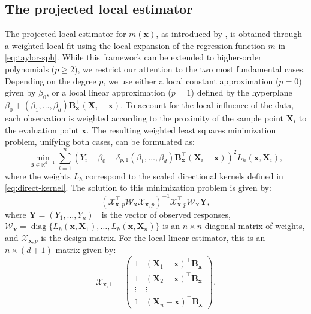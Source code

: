 \documentclass[12pt]{report} %
\newcommand{\bX}{\mathbf{X}}
\newcommand{\bx}{\mathbf{x}}
\newcommand{\bY}{\mathbf{Y}}
\newcommand{\bbe}{\boldsymbol{\beta}}
\newcommand{\bbX}{\boldsymbol{\mathcal{X}}}
\newcommand{\bbW}{\boldsymbol{\mathcal{W}}}
\newcommand{\bB}{\mathbf{B}}
\begin{document}
\subsection*{The projected local estimator}


The projected local estimator for $m(\bx)$, as introduced by \citet{Garcia-Portugues2014a}, is obtained through a weighted local fit using the local expansion of the regression function $m$ in \eqref{eq:taylor-sph}. While this framework can be extended to higher-order polynomials ($p \geq 2$), we restrict our attention to the two most fundamental cases. Depending on the degree $p$, we use either a local constant approximation ($p = 0$) given by $\beta_0$, or a local linear approximation ($p = 1$) defined by the hyperplane $\beta_0 + (\beta_1, \dots, \beta_d) \bB_{\bx}^\top (\bX_i - \bx)$. To account for the local influence of the data, each observation is weighted according to the proximity of the sample point $\bX_i$ to the evaluation point $\bx$. The resulting weighted least squares minimization problem, unifying both cases, can be formulated as:
\begin{equation}
\min_{\bbe \in \mathbb{R}^{d+1}} \sum_{i=1}^{n} \left( Y_i - \beta_0 - \delta_{p,1} (\beta_1, \dots, \beta_d) \bB_{\bx}^\top (\bX_i - \bx) \right)^2 L_h(\bx, \bX_i),
\end{equation}
where the weights $L_h$ correspond to the scaled directional kernels defined in \eqref{eq:direct-kernel}. The solution to this minimization problem is given by:
\begin{equation}
\label{eq:proj-loc-est}
\left(\bbX_{\bx,p}^\top \bbW_{\bx} \bbX_{\bx,p}\right)^{-1}\bbX_{\bx,p}^\top \bbW_{\bx}\bY,
\end{equation}
where $\mathbf{Y} = (Y_1, \dots, Y_n)^\top$ is the vector of observed responses, $\bbW_{\bx} = \operatorname{diag}\{L_h(\bx,\bX_1), \allowbreak \dots, \allowbreak L_h(\bx,\bX_n)\}$ is an $n \times n$ diagonal matrix of weights, and $\bbX_{\bx,p}$ is the design matrix. For the local linear estimator, this is an $n \times (d + 1)$ matrix given by:
\begin{equation*}
    \bbX_{\bx,1} =
    \begin{pmatrix}
    1 & (\bX_1 - \bx)^\top \bB_{\bx} \\
    1 & (\bX_2 - \bx)^\top \bB_{\bx} \\
    \vdots & \vdots \\
    1 & (\bX_n - \bx)^\top \bB_{\bx}
    \end{pmatrix}.
\end{equation*}
\end{document}

